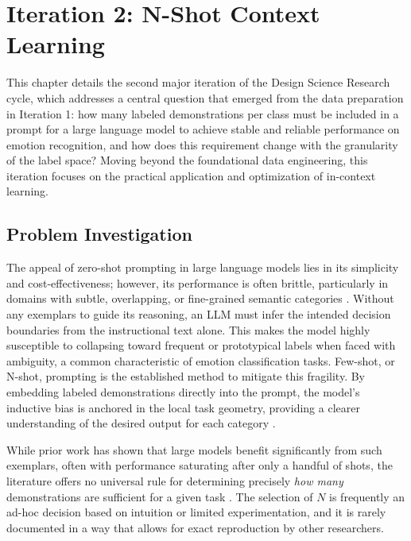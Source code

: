 \section{Iteration 2: N-Shot Context Learning}


This chapter details the second major iteration of the Design Science Research cycle, which addresses a central question that emerged from the data preparation in Iteration 1: how many labeled demonstrations per class must be included in a prompt for a large language model to achieve stable and reliable performance on emotion recognition, and how does this requirement change with the granularity of the label space? Moving beyond the foundational data engineering, this iteration focuses on the practical application and optimization of in-context learning.


\subsection{Problem Investigation}

The appeal of zero-shot prompting in large language models lies in its simplicity and cost-effectiveness; however, its performance is often brittle, particularly in domains with subtle, overlapping, or fine-grained semantic categories \cite{brown2020gpt3}. Without any exemplars to guide its reasoning, an LLM must infer the intended decision boundaries from the instructional text alone. This makes the model highly susceptible to collapsing toward frequent or prototypical labels when faced with ambiguity, a common characteristic of emotion classification tasks. Few-shot, or N-shot, prompting is the established method to mitigate this fragility. By embedding labeled demonstrations directly into the prompt, the model's inductive bias is anchored in the local task geometry, providing a clearer understanding of the desired output for each category \cite{brown2020gpt3}.

While prior work has shown that large models benefit significantly from such exemplars, often with performance saturating after only a handful of shots, the literature offers no universal rule for determining precisely \textit{how many} demonstrations are sufficient for a given task \cite{openai2023gpt4}. The selection of $N$ is frequently an ad-hoc decision based on intuition or limited experimentation, and it is rarely documented in a way that allows for exact reproduction by other researchers.

